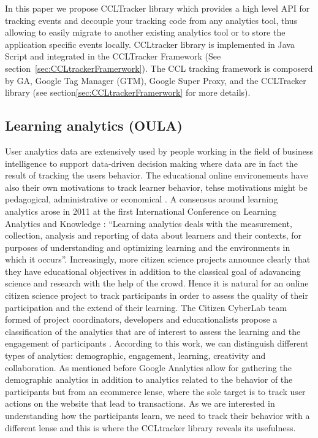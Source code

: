 \documentclass{article}
\begin{document}


In this paper we propose CCLTracker library which provides a high level API for tracking events and decouple your tracking code from any analytics tool, thus allowing to easily migrate to another existing analytics tool or to store the application specific events locally. CCLtracker library is implemented in Java Script and integrated in the CCLTracker Framework (See section~\ref{sec:CCLtrackerFramerwork}). The CCL tracking framework is composerd by GA, Google Tag Manager (GTM), Google Super Proxy, and the CCLTracker library (see section\ref{sec:CCLtrackerFramerwork} for more details). 


\subsection{Learning analytics (OULA)}
User analytics data are extensively used by people working in the field of business intelligence to support data-driven decision making where data are in fact the result of tracking the users behavior. The educational online environements have also their own motivations to track learner behavior, tehse motivations might be pedagogical, administrative or economical \cite{ferguson2012learning}.
A consensus around learning analytics arose in 2011 at the first  International Conference on Learning Analytics and Knowledge \cite{LAK11}: “Learning analytics deals with the measurement, collection, analysis and reporting of data about learners and their contexts, for purposes of understanding and optimizing learning and the environments in which it occurs”.
Increasingly, more citizen science projects announce clearly that they have educational objectives in addition to the classical goal of adavancing science and research with the help of the crowd. Hence it is natural for an online citizen science project to track  participants in order to assess the quality of their participation and the extend of their learning. The Citizen CyberLab team formed of  project coordinators, developers and educationalists propose a classification of the analytics that are of interest to assess the learning and the engagement of participants \cite{LAFW}. According to this work, we can distinguish different types of analytics: demographic, engagement, learning, creativity and collaboration. As mentioned before Google Analytics allow for gathering the demographic analytics in addition to analytics related to the behavior of the participants but from an ecommerce lense, where the sole target is to track user actions on the website that lead to transactions. As we are interested in understanding how the participants learn, we need to track their behavior with a different lense and this is where the CCLtracker library reveals its usefulness.
\end{document}
